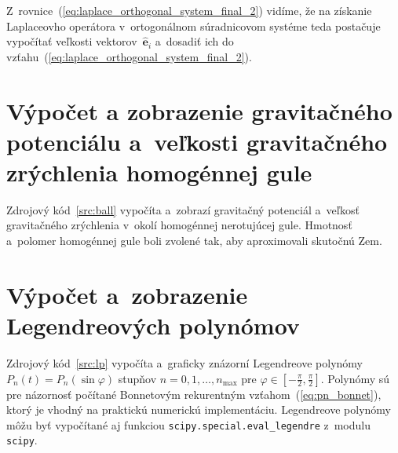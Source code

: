 \documentclass[a4paper, 12pt]{book}
\let\vec\mathbf
\begin{document}
Z~rovnice~(\ref{eq:laplace_orthogonal_system_final_2}) vidíme, že na získanie 
Laplaceovho operátora v~ortogonálnom súradnicovom systéme teda postačuje 
vypočítať veľkosti vektorov~$\hat{\vec e}_i$ a~dosadiť ich do 
vzťahu~(\ref{eq:laplace_orthogonal_system_final_2}).




\chapter{Výpočet a zobrazenie gravitačného potenciálu a~veľkosti gravitačného 
zrýchlenia homogénnej gule}
\label{app:ball}

Zdrojový kód~\ref{src:ball} vypočíta a~zobrazí gravitačný potenciál a~veľkosť 
gravitačného zrýchlenia v~okolí homogénnej nerotujúcej gule.  Hmotnosť 
a~polomer homogénnej gule boli zvolené tak, aby aproximovali skutočnú Zem.

\vspace{2ex}






\chapter{Výpočet a~zobrazenie Legendreových polynómov}
\label{app:lp}

Zdrojový kód~\ref{src:lp} vypočíta a~graficky znázorní Legendreove polynómy 
$P_n(t) = P_n(\sin\varphi)$ stupňov $n = 0, 1, \dots, n_{\max}$ pre $\varphi 
\in [-\frac{\pi}{2}, \frac{\pi}{2}]$.  Polynómy sú pre názornosť počítané 
Bonnetovým rekurentným vzťahom~(\ref{eq:pn_bonnet}), ktorý je vhodný na 
praktickú numerickú implementáciu.  Legendreove polynómy môžu byť vypočítané aj 
funkciou \texttt{scipy.special.eval\_legendre} z~modulu \texttt{scipy}.

\vspace{4ex}


\end{document}
